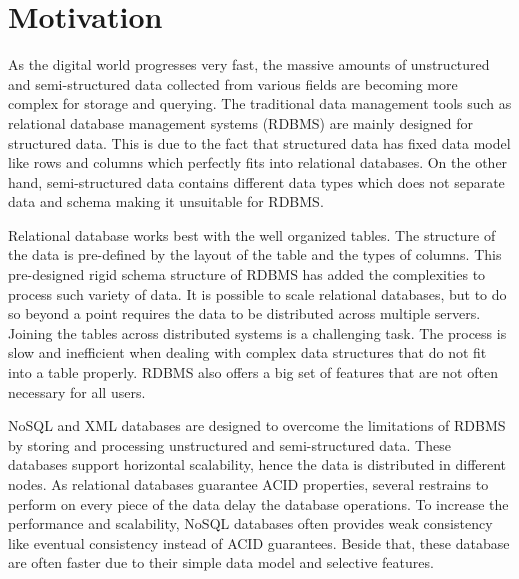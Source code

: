 
\section{Motivation}
		\label{motivation}
		    As the digital world progresses very fast, the massive amounts of unstructured and semi-structured data collected from various fields are becoming more complex for storage and querying. The traditional data management tools such as relational database management systems (RDBMS) are mainly designed for structured data. This is due to the fact that structured data has fixed data model like rows and columns which perfectly fits into relational databases. On the other hand, semi-structured data contains different data types which does not separate data and schema making it unsuitable for RDBMS.
\par		
Relational database works best with the well organized tables. The structure of the data is pre-defined by the layout of the table and the types of columns. This pre-designed rigid schema structure of RDBMS has added the complexities to process such variety of data. It is possible to scale relational databases, but to do so beyond a point requires the data to be distributed across multiple servers. Joining the tables across distributed systems is a challenging task. The process is slow and inefficient when dealing with complex data structures that do not fit into a table properly. RDBMS also offers a big set of features that are not often necessary for all users. 
	\par
NoSQL and XML databases are designed to overcome the limitations of RDBMS by storing and processing unstructured and semi-structured data. These databases support horizontal scalability, hence the data is distributed in different nodes. As relational databases guarantee ACID properties, several restrains to perform on every piece of the data delay the database operations. To increase the performance and scalability, NoSQL databases often provides weak consistency like eventual consistency instead of ACID guarantees. Beside that, these database are often faster due to their simple data model and selective features.
